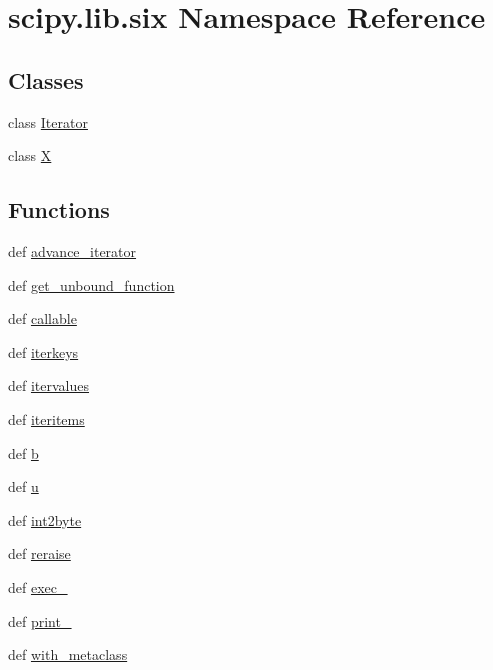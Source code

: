 \hypertarget{namespacescipy_1_1lib_1_1six}{}\section{scipy.\+lib.\+six Namespace Reference}
\label{namespacescipy_1_1lib_1_1six}
\subsection*{Classes}
\begin{DoxyCompactItemize}
\item 
class \hyperlink{classscipy_1_1lib_1_1six_1_1Iterator}{Iterator}
\item 
class \hyperlink{classscipy_1_1lib_1_1six_1_1X}{X}
\end{DoxyCompactItemize}
\subsection*{Functions}
\begin{DoxyCompactItemize}
\item 
def \hyperlink{namespacescipy_1_1lib_1_1six_a208b1b8597ff9233b6e4322d4eda489e}{advance\+\_\+iterator}
\item 
def \hyperlink{namespacescipy_1_1lib_1_1six_ac186c99d12743b46f27e63b472564aaf}{get\+\_\+unbound\+\_\+function}
\item 
def \hyperlink{namespacescipy_1_1lib_1_1six_a34f8491a2018193d0312c430025511cf}{callable}
\item 
def \hyperlink{namespacescipy_1_1lib_1_1six_a0830b01cf190e88b5b493bde10f4f1ff}{iterkeys}
\item 
def \hyperlink{namespacescipy_1_1lib_1_1six_a86d6a35fad15bf2f96bb0fd5c25d4641}{itervalues}
\item 
def \hyperlink{namespacescipy_1_1lib_1_1six_ab571bd4223a8eaabf46d5e18331122ac}{iteritems}
\item 
def \hyperlink{namespacescipy_1_1lib_1_1six_abaa5763396edc34b6381e0abd885176b}{b}
\item 
def \hyperlink{namespacescipy_1_1lib_1_1six_a887431081a4cc7f6fc434dd9252c670c}{u}
\item 
def \hyperlink{namespacescipy_1_1lib_1_1six_ae26f4da955f7ef4ed90e08086eb923ff}{int2byte}
\item 
def \hyperlink{namespacescipy_1_1lib_1_1six_a6a79e9f81f607900ef7b5f5c8bb26103}{reraise}
\item 
def \hyperlink{namespacescipy_1_1lib_1_1six_a132cfe6c0148323eb059c20cb28f18ee}{exec\+\_\+}
\item 
def \hyperlink{namespacescipy_1_1lib_1_1six_a21f25a03a65796f12b88fa0e6b2c3c49}{print\+\_\+}
\item 
def \hyperlink{namespacescipy_1_1lib_1_1six_af09821bab1703c8b3b48ddb0a39f5893}{with\+\_\+metaclass}
\end{DoxyCompactItemize}
